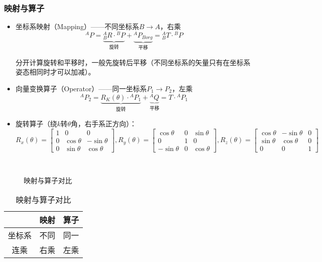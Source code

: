 \documentclass[
12pt, %
a4paper, 
oneside, %
headinclude,footinclude, %
]{scrartcl}
\begin{document}
\subsubsection[映射与算子]{映射与算子}
\begin{itemize}
\item 坐标系映射（Mapping）——不同坐标系$ B \rightarrow A $，右乘
$$ {}^A P = \underbrace{{}^A_B R \cdot {}^B P}_{\text{旋转}} + \underbrace{{}^A P_{Borg}}_{\text{平移}} = {}^A_B T \cdot {}^B P $$

\hspace{2em}
分开计算旋转和平移时，一般先旋转后平移（不同坐标系的矢量只有在坐标系姿态相同时才可以加减）。
\item 向量变换算子（Operator）——同一坐标系$ P_1 \rightarrow P_2 $，左乘
$$ {}^A P_2 = \underbrace{R_K(\theta) \cdot {}^A P_1}_{\text{旋转}} + \underbrace{{}^A Q}_{\text{平移}} = T \cdot {}^A P_1 $$
\item 旋转算子（绕$ k $转$ \theta $角，右手系正方向）：
$$
R_x(\theta) = \begin{bmatrix} 1 & 0 & 0 \\ 0 & \cos\theta & -\sin\theta \\ 0 & \sin\theta & \cos\theta \end{bmatrix}, 
R_y(\theta) = \begin{bmatrix} \cos\theta & 0 & \sin\theta \\ 0 & 1 & 0 \\ -\sin\theta & 0 & \cos\theta \end{bmatrix}, 
R_z(\theta) = \begin{bmatrix} \cos\theta & -\sin\theta & 0 \\ \sin\theta & \cos\theta & 0 \\ 0 & 0 & 1 \end{bmatrix}
$$
\end{itemize}
\begin{minipage}{0.6\textwidth}
\begin{figure}[H]
\centering
{} \quad
{} \\
 \quad
{}
\caption{映射与算子对比}
\end{figure}
\end{minipage}
\begin{minipage}{0.4\textwidth}
\begin{table}[H]
\centering
\begin{tabular}{c|cc}
\hline
& 映射 & 算子 \\
\hline
坐标系 & 不同 & 同一 \\
连乘 & 右乘 & 左乘 \\
\hline
\end{tabular}
\caption{映射与算子对比}
\end{table}
\end{minipage}
\end{document}
